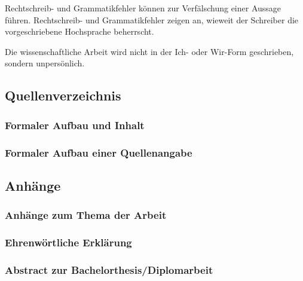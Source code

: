Rechtschreib- und Grammatikfehler können zur Verfälschung einer Aussage führen.
Rechtschreib- und Grammatikfehler zeigen an, wieweit der Schreiber die vorgeschriebene Hochsprache beherrscht.

Die wissenschaftliche Arbeit wird nicht in der Ich- oder Wir-Form geschrieben, sondern unpersönlich.
\subsection{Quellenverzeichnis}
\label{formal-gestaltung-quellenverzeichnis}
\subsubsection{Formaler Aufbau und Inhalt}
\label{formal-gestaltung-quellenverzeichnis-inhalt}
\subsubsection{Formaler Aufbau einer Quellenangabe}
\label{formal-gestaltung-quellenverzeichnis-quelle}
\subsection{Anhänge}
\label{formal-gestaltung-anhaenge}
\subsubsection{Anhänge zum Thema der Arbeit}
\label{formal-gestaltung-anhaenge-anhaenge}
\subsubsection{Ehrenwörtliche Erklärung}
\label{formal-gestaltung-anhaenge-erklaerung}
\subsubsection{Abstract zur Bachelorthesis/Diplomarbeit}
\label{formal-gestaltung-anhaenge-abstract}
